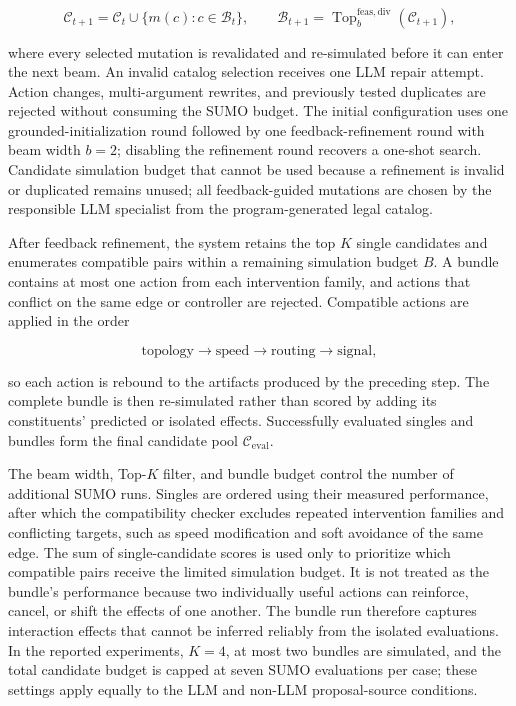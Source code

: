\documentclass{trbunofficial}
\begin{document}
\begin{equation}
\mathcal{C}_{t+1}=\mathcal{C}_{t}\cup
\{m(c):c\in\mathcal{B}_{t}\},\qquad
\mathcal{B}_{t+1}=\operatorname{Top}_{b}^{\mathrm{feas,div}}
(\mathcal{C}_{t+1}),
\label{eq:feedback-beam-update}
\end{equation}

where every selected mutation is revalidated and re-simulated before it can
enter the next beam.  An invalid catalog selection receives one LLM repair
attempt.  Action changes, multi-argument rewrites, and previously tested
duplicates are rejected without consuming the SUMO budget.  The initial
configuration uses one grounded-initialization round followed by one
feedback-refinement round with beam width $b=2$; disabling the refinement round
recovers a one-shot search.  Candidate simulation
budget that cannot be used because a refinement is invalid or duplicated
remains unused; all feedback-guided mutations are chosen by the responsible LLM
specialist from the program-generated legal catalog.

After feedback refinement, the system retains the top $K$ single candidates and
enumerates compatible pairs within a remaining simulation budget $B$.  A bundle contains at most one action from each
intervention family, and actions that conflict on the same edge or controller
are rejected.  Compatible actions are applied in the order

\begin{equation}
\text{topology}\rightarrow\text{speed}\rightarrow
\text{routing}\rightarrow\text{signal},
\label{eq:bundle-order}
\end{equation}

so each action is rebound to the artifacts produced by the preceding step.
The complete bundle is then re-simulated rather than scored by adding its
constituents' predicted or isolated effects.  Successfully evaluated singles
and bundles form the final candidate pool $\mathcal{C}_{\mathrm{eval}}$.

The beam width, Top-$K$ filter, and bundle budget control the number of
additional SUMO runs.  Singles are ordered using their measured performance, after which the
compatibility checker excludes repeated intervention families and conflicting
targets, such as speed modification and soft avoidance of the same edge.  The
sum of single-candidate scores is used only to prioritize which compatible
pairs receive the limited simulation budget.  It is not treated as the bundle's
performance because two individually useful actions can reinforce, cancel, or
shift the effects of one another.  The bundle run therefore captures interaction
effects that cannot be inferred reliably from the isolated evaluations.  In
the reported experiments, $K=4$, at most two bundles are simulated, and the
total candidate budget is capped at seven SUMO evaluations per case; these
settings apply equally to the LLM and non-LLM proposal-source conditions.
\end{document}
